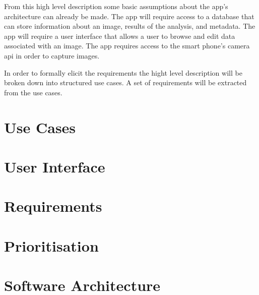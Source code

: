 From this high level description some basic assumptions about the app’s architecture can already be made. The app will require access to a database that can store information about an image, results of the analysis, and metadata. The app will require a user interface that allows a user to browse and edit data associated with an image. The app requires access to the smart phone’s camera api in order to capture images.

In order to formally elicit the requirements the hight level description will be broken down into structured use cases. A set of requirements will be extracted from the use cases.

\section{Use Cases}




\section{User Interface}


\section{Requirements}














\section{Prioritisation}


\section{Software Architecture}

